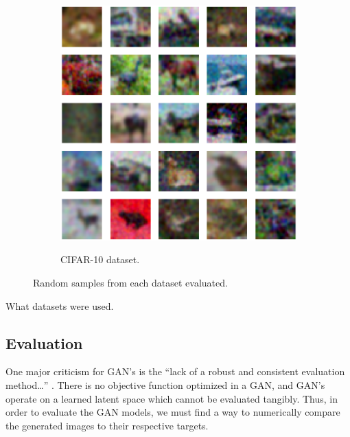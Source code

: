 \documentclass[letterpaper]{article} %
\begin{document}
\begin{figure}[h!]
\begin{subfigure}{0.23\textwidth}
\begin{center}
\begin{minipage}[t]{0.95\linewidth}
\begin{centering}
{\includegraphics[width=\linewidth]{cifar_samplesxrange.png}}
\caption{CIFAR-10 dataset.}
\label{fig:cifar_dataset}
\end{centering}
\end{minipage}
\end{center}
\end{subfigure}
\caption{Random samples from each dataset evaluated.}
\label{fig:datasets}
\end{figure}

What datasets were used. %

\subsection{Evaluation}
One major criticism for GAN's is the
``lack of a robust and consistent evaluation method\dots''
\cite{gmm}.
There is no objective function optimized in a GAN,
and GAN's operate on a learned latent space
which cannot be evaluated tangibly.
Thus, in order to evaluate the GAN models,
we must find a way to numerically compare the generated images to their respective targets.
\end{document}
